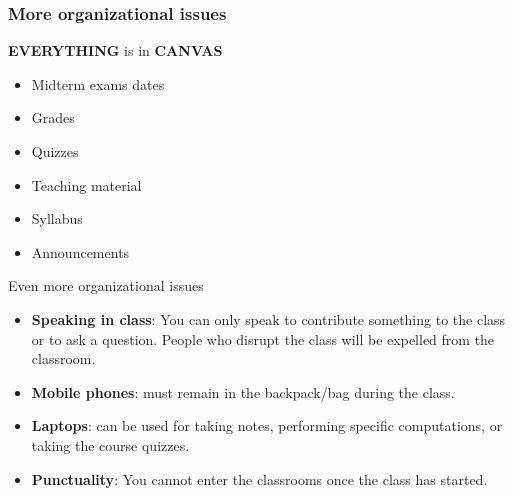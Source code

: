 \documentclass[9pt]{beamer}
\begin{document}

\begin{frame}
\frametitle{More organizational issues}
\centering
{\huge\alert{\textbf{EVERYTHING}} is in \alert{\textbf{CANVAS}}}
\vspace{1.5cm}

\hspace{0.3cm}
\begin{minipage}{0.3\textwidth}
\begin{itemize}
    \item[$\bullet$] Midterm exams dates
    \item[$\bullet$] Grades
\end{itemize}
\end{minipage}
\begin{minipage}{0.3\textwidth}
\begin{itemize}
    \item[$\bullet$] Quizzes
    \item[$\bullet$] Teaching material
\end{itemize}
\end{minipage}
\begin{minipage}{0.3\textwidth}
\begin{itemize}
    \item[$\bullet$] Syllabus
    \item[$\bullet$] Announcements
\end{itemize}
\end{minipage}
\end{frame}

\begin{frame}{Even more organizational issues}

    \begin{itemize}[leftmargin = 0.5cm, label = $\bullet$]

    \item \textbf{Speaking in class}: You can only speak to contribute something to the class or to ask a question. People who disrupt the class will be expelled from the classroom. \medskip

    \item \textbf{Mobile phones}: must remain in the backpack/bag during the class. \medskip

    \item \textbf{Laptops}: can be used for taking notes, performing specific computations, or taking the course quizzes. \medskip

    \item \textbf{Punctuality}: You cannot enter the classrooms once the class has started.

    \end{itemize}
    
\end{frame}
\end{document}
